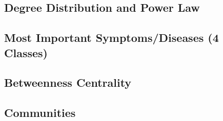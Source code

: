 
\subsection{Degree Distribution and Power Law}


\subsection{Most Important Symptoms/Diseases (4 Classes)}


\subsection{Betweenness Centrality}


\subsection{Communities}



